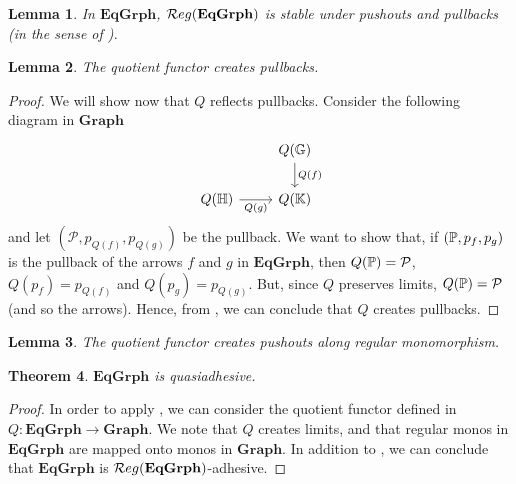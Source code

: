 \documentclass[a4paper, twoside,openright]{report}
\theoremstyle{plain}
\newtheorem{theorem}{Theorem}[section]
\newtheorem{lemma}[theorem]{Lemma}
\theoremstyle{definition}
\begin{document}
\begin{lemma}\label{lemma:eqgrph_stab_po_pb}
    In $\mathbf{EqGrph}$,  $\mathcal{R}eg(\mathbf{EqGrph})$ is stable under pushouts and pullbacks (in the sense of ).
\end{lemma}


\begin{lemma}
    The quotient functor creates pullbacks.
\end{lemma}

\begin{proof}
    We will show now that $Q$ reflects pullbacks.
    Consider the following diagram in $\mathbf{Graph}$
    \[
        \begin{tikzcd}
            & Q(\eqgraph{G}) \arrow[d, "Q(f)"] \\
            Q(\eqgraph{H}) \arrow[r, "Q(g)"swap] & Q(\eqgraph{K})
        \end{tikzcd}
    \]
    and let $(\mathcal P, p_{Q(f)}, p_{Q(g)})$ be the pullback. We want to show that, if  $(\mathbb{P}, p_f, p_g)$ is the pullback of the arrows $f$ and $g$ in $\mathbf{EqGrph}$, then $Q(\mathbb{P}) = \mathcal{P}$, $Q(p_f) = p_{Q(f)}$ and $Q(p_g) = p_{Q(g)}$. But, since $Q$ preserves limits, $Q(\mathbb{P}) = \mathcal{P}$ (and so the arrows).
    Hence, from , we can conclude that $Q$ creates pullbacks.
\end{proof}

\begin{lemma}
    The quotient functor creates pushouts along regular monomorphism.
\end{lemma}


\begin{theorem}
    $\mathbf{EqGrph}$ is quasiadhesive.
\end{theorem}

\begin{proof}
    In order to apply , we can consider the quotient functor defined in  $Q: \mathbf{EqGrph \rightarrow Graph}$. We note that $Q$ creates limits, and that regular monos in $\mathbf{EqGrph}$ are mapped onto monos in $\mathbf{Graph}$. In addition to , we can conclude that $\mathbf{EqGrph}$ is $\mathcal{R}eg(\mathbf{EqGrph})$-adhesive.
\end{proof}
\end{document}
